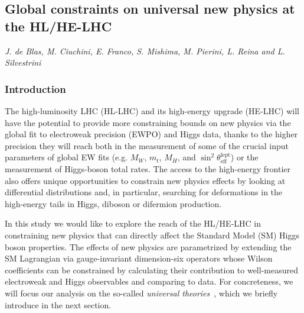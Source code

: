 

\newcommand{\HEPfit}{{\tt HEPfit}}


\subsection{Global constraints on universal new physics at the HL/HE-LHC}
\begin{center}
	\textit{J. de Blas, M. Ciuchini, E. Franco, S. Mishima, M. Pierini, L. Reina and L. Silvestrini}
\end{center}


\subsubsection{Introduction}

The high-luminosity LHC (HL-LHC) and its high-energy upgrade (HE-LHC)
will have the potential to provide more constraining bounds on new
physics via the global fit to electroweak precision (EWPO) and Higgs
data, thanks to the higher precision they will reach both in the
measurement of some of the crucial input parameters of global EW fits
(e.g. $M_W$, $m_t$, $M_H$, and
$\sin^2\theta_{\mathrm{eff}}^{\mathrm{lept}}$) or the measurement
of Higgs-boson total rates.
The access to the high-energy frontier also offers unique opportunities
to constrain new physics effects by looking at differential distributions and,
 in particular, searching for deformations in the 
high-energy tails in Higgs, diboson or difermion production.  

In this study we would
like to explore the reach of the HL/HE-LHC in constraining new physics
that can directly affect the Standard Model (SM) Higgs boson
properties. The effects of new physics are parametrized by extending
the SM Lagrangian via gauge-invariant dimension-six operators whose
Wilson coefficients can be constrained by calculating their
contribution to well-measured electroweak and Higgs observables and
comparing to data. For concreteness, we will focus our analysis on the 
so-called {\it universal theories}~\cite{Barbieri:2004qk,Wells:2015uba},
which we briefly introduce in the next section.


